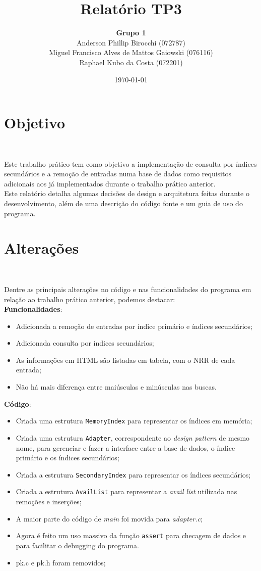 \documentclass{article}
\title{\textbf{Relatório TP3}}
\author{\textbf{Grupo 1} \\
  Anderson Phillip Birocchi (072787) \\
  Miguel Francisco Alves de Mattos Gaiowski (076116) \\
  Raphael Kubo da Costa (072201)}
\date{\today}
\begin{document}
\maketitle

\section{Objetivo}\

Este trabalho prático tem como objetivo a implementação de consulta por índices secundários e a remoção de entradas numa base de dados como requisitos adicionais aos já implementados durante o trabalho prático anterior.\\

Este relatório detalha algumas decisões de design e arquitetura feitas durante o desenvolvimento, além de uma descrição do código fonte e um guia de uso do programa.

\section{Alterações}\

Dentre as principais alterações no código e nas funcionalidades do programa em relação ao trabalho prático anterior, podemos destacar:\\

\textbf{Funcionalidades}:
\begin{itemize}
 \item Adicionada a remoção de entradas por índice primário e índices secundários;
\item Adicionada consulta por índices secundários;
\item As informações em HTML são listadas em tabela, com o NRR de cada entrada;
\item Não há mais diferença entre maiúsculas e minúsculas nas buscas.
\end{itemize}

\textbf{Código}:
\begin{itemize}
 \item Criada uma estrutura \texttt{MemoryIndex} para representar os índices em memória;
\item Criada uma estrutura \texttt{Adapter}, correspondente ao \textit{design pattern} de mesmo nome, para gerenciar e fazer a interface entre a base de dados, o índice primário e os índices secundários;
\item Criada a estrutura \texttt{SecondaryIndex} para representar os índices secundários;
\item Criada a estrutura \texttt{AvailList} para representar a \textit{avail list} utilizada nas remoções e inserções;
\item A maior parte do código de \textit{main} foi movida para \textit{adapter.c};
\item Agora é feito um uso massivo da função \texttt{assert} para checagem de dados e para facilitar o debugging do programa.
\item pk.c e pk.h foram removidos;
\end{itemize}
\end{document}
